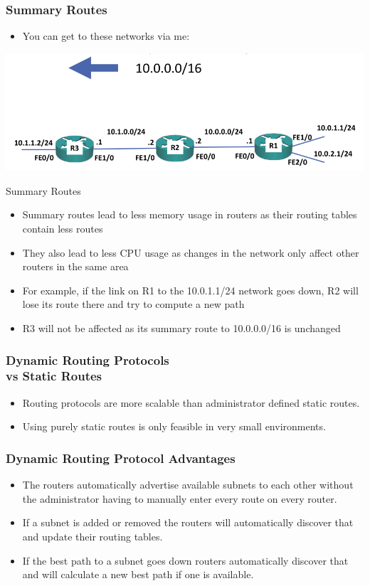 \documentclass[pdflatex,compress,mathserif]{beamer}
\begin{document}
\begin{frame}
	\frametitle{Summary Routes}
	\begin{itemize}
		\item You can get to these networks via me:
	\end{itemize}
	\begin{center}
		\includegraphics[width=\linewidth]{img/img05}
	\end{center}
\end{frame}

\begin{frame}{Summary Routes}
	\begin{itemize}
		\item Summary routes lead to less memory usage in routers as their routing tables contain less routes
		\item They also lead to less CPU usage as changes in the network only affect
other routers in the same area
		\item For example, if the link on R1 to the 10.0.1.1/24 network goes down, R2
will lose its route there and try to compute a new path
		\item R3 will not be affected as its summary route to 10.0.0.0/16 is unchanged
	\end{itemize}
\end{frame}

\begin{frame}
	\frametitle{Dynamic Routing Protocols\\vs Static Routes}
	\begin{itemize}
		\item Routing protocols are more scalable than administrator defined static
routes.
		\item Using purely static routes is only feasible in very small environments.
	\end{itemize}
\end{frame}

\begin{frame}
	\frametitle{Dynamic Routing Protocol Advantages}
	\begin{itemize}
		\item The routers automatically advertise available subnets to each other
without the administrator having to manually enter every route on every
		router.
		\item If a subnet is added or removed the routers will automatically discover
that and update their routing tables.
		\item If the best path to a subnet goes down routers automatically discover
that and will calculate a new best path if one is available.
	\end{itemize}
\end{frame}
\end{document}
